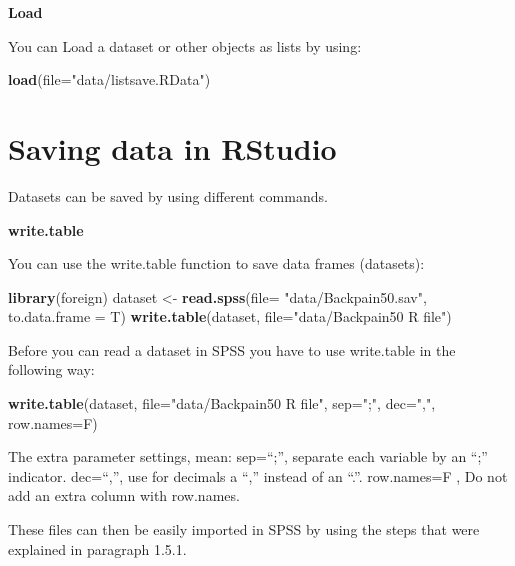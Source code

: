 \documentclass[
]{book}
\newenvironment{Shaded}{\begin{snugshade}}{\end{snugshade}}
\newcommand{\DataTypeTok}[1]{\textcolor[rgb]{0.13,0.29,0.53}{#1}}
\newcommand{\KeywordTok}[1]{\textcolor[rgb]{0.13,0.29,0.53}{\textbf{#1}}}
\newcommand{\NormalTok}[1]{#1}
\newcommand{\StringTok}[1]{\textcolor[rgb]{0.31,0.60,0.02}{#1}}
\begin{document}
\textbf{Load}

You can Load a dataset or other objects as lists by using:

\begin{Shaded}
\begin{Highlighting}[]
\KeywordTok{load}\NormalTok{(}\DataTypeTok{file=}\StringTok{"data/listsave.RData"}\NormalTok{)}
\end{Highlighting}
\end{Shaded}

\hypertarget{saving-data-in-rstudio}{%
\section{Saving data in RStudio}\label{saving-data-in-rstudio}}

Datasets can be saved by using different commands.

\textbf{write.table}

You can use the write.table function to save data frames (datasets):

\begin{Shaded}
\begin{Highlighting}[]
\KeywordTok{library}\NormalTok{(foreign)}
\NormalTok{dataset <-}\StringTok{ }\KeywordTok{read.spss}\NormalTok{(}\DataTypeTok{file=} \StringTok{"data/Backpain50.sav"}\NormalTok{, }\DataTypeTok{to.data.frame =}\NormalTok{ T)}
\KeywordTok{write.table}\NormalTok{(dataset, }\DataTypeTok{file=}\StringTok{"data/Backpain50 R file"}\NormalTok{)}
\end{Highlighting}
\end{Shaded}

Before you can read a dataset in SPSS you have to use write.table in the following way:

\begin{Shaded}
\begin{Highlighting}[]
\KeywordTok{write.table}\NormalTok{(dataset, }\DataTypeTok{file=}\StringTok{"data/Backpain50 R file"}\NormalTok{, }\DataTypeTok{sep=}\StringTok{";"}\NormalTok{, }\DataTypeTok{dec=}\StringTok{","}\NormalTok{, }\DataTypeTok{row.names=}\NormalTok{F)}
\end{Highlighting}
\end{Shaded}

The extra parameter settings, mean:
sep=``;'', separate each variable by an ``;'' indicator.
dec=``,'', use for decimals a ``,'' instead of an ``.''.
row.names=F , Do not add an extra column with row.names.

These files can then be easily imported in SPSS by using the steps that were explained in paragraph 1.5.1.
\end{document}
